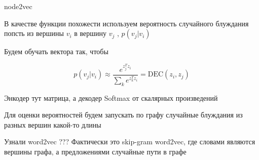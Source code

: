 \documentclass[notes,12pt, aspectratio=169]{beamer}
\newenvironment{wideitemize}{\itemize\addtolength{\itemsep}{10pt}}{\enditemize}
\newcommand{\DEC}{\text{DEC}}
\begin{document}
\begin{frame}{node2vec}
	\begin{wideitemize}
		\item  В качестве функции похожести используем вероятность случайного блуждания  попсть из вершины $v_i$ в вершину $v_j$ ,   $p(v_j|v_i)$
		
		\item Будем обучать вектора так, чтобы 
		
		\[ p(v_j|v_i) \approx \frac{e^{z_j^T z_i}}{\sum_k e^{z_k^T z_i}} = \DEC(z_i, z_j) \]
		
		\item Энкодер тут матрица, а декодер Softmax от скалярных произведений  \pause 
		
		\item  Для оценки вероятностей будем запускать по графу случайные блуждания из разных вершин какой-то длины  \pause 
		
		\item  \alert{Узнали word2vec ???}  Фактически это skip-gram word2vec, где словами являются вершины графа, а предложениями случайные пути в графе
	\end{wideitemize}
\end{frame}
\end{document}
